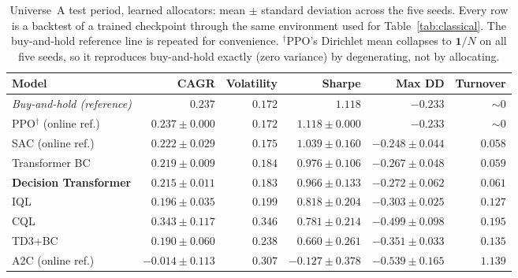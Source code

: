 \documentclass[11pt]{article}
\begin{document}
\begin{table}[t]
\centering
\caption{Universe~A test period, learned allocators: mean $\pm$ standard deviation across the
five seeds. Every row is a backtest of a trained checkpoint through the same environment used
for Table~\ref{tab:classical}. The buy-and-hold reference line is repeated for convenience.
$^\dagger$PPO's Dirichlet mean collapses to $\mathbf{1}/N$ on all five seeds, so it reproduces
buy-and-hold exactly (zero variance) by degenerating, not by allocating.}
\label{tab:learned}
\small
\begin{tabular}{lrrrrr}
\toprule
Model & CAGR & Volatility & \textbf{Sharpe} & Max DD & Turnover \\
\midrule
\emph{Buy-and-hold (reference)} & $0.237$ & $0.172$ & $1.118$ & $-0.233$ & ${\sim}0$ \\
\midrule
PPO$^\dagger$ (online ref.) & $0.237 \pm 0.000$ & $0.172$ & $1.118 \pm 0.000$ & $-0.233$ & ${\sim}0$ \\
SAC (online ref.)           & $0.222 \pm 0.029$ & $0.175$ & $1.039 \pm 0.160$ & $-0.248 \pm 0.044$ & $0.058$ \\
Transformer BC              & $0.219 \pm 0.009$ & $0.184$ & $0.976 \pm 0.106$ & $-0.267 \pm 0.048$ & $0.059$ \\
\textbf{Decision Transformer} & $0.215 \pm 0.011$ & $0.183$ & $0.966 \pm 0.133$ & $-0.272 \pm 0.062$ & $0.061$ \\
IQL                         & $0.196 \pm 0.035$ & $0.199$ & $0.818 \pm 0.204$ & $-0.303 \pm 0.025$ & $0.127$ \\
CQL                         & $\mathbf{0.343 \pm 0.117}$ & $0.346$ & $0.781 \pm 0.214$ & $-0.499 \pm 0.098$ & $0.195$ \\
TD3+BC                      & $0.190 \pm 0.060$ & $0.238$ & $0.660 \pm 0.261$ & $-0.351 \pm 0.033$ & $0.135$ \\
A2C (online ref.)           & $-0.014 \pm 0.113$ & $0.307$ & $-0.127 \pm 0.378$ & $-0.539 \pm 0.165$ & $1.139$ \\
\bottomrule
\end{tabular}
\end{table}
\end{document}

